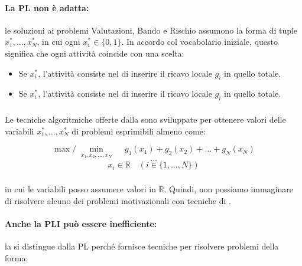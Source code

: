 
\paragraph{La PL non è adatta:} le soluzioni ai problemi Valutazioni, Bando e Rischio assumono la forma di tuple \( x^*_1 , ..., x^*_N \), in cui ogni \( x^*_i \in \{0, 1\} \). In accordo col vocabolario iniziale, questo significa che ogni attività coincide con una scelta:

\begin{itemize}
  \item Se $x^*_i$, l'attività consiste nel  di inserire il ricavo locale $g_i$ in quello totale. 
  \item Se $x^*_i$, l'attività consiste nel  di inserire il ricavo locale $g_i$ in quello totale.
\end{itemize}
\subsubsection{}
Le tecniche algoritmiche offerte dalla  sono sviluppate per ottenere valori delle variabili \( x^*_1, \dots, x^*_N \) di problemi esprimibili almeno come:

\begin{equation}
    \max/\min_{\substack{x_1, x_2, \dots, x_N}} \quad g_1(x_1) + g_2(x_2) + \dots + g_N(x_N)
\end{equation}
\[
    \dots
\]
\begin{equation}
    x_i \in \mathbb{R} \quad (i \in \{1, \dots, N\})
\end{equation}
\subsubsection{}
in cui le variabili posso assumere valori in \( \mathbb{R} \). Quindi, non possiamo immaginare di risolvere alcuno dei problemi motivazionali con tecniche di .

\paragraph{Anche la PLI può essere inefficiente:} la  si distingue dalla PL perché fornisce tecniche per risolvere problemi della forma:

